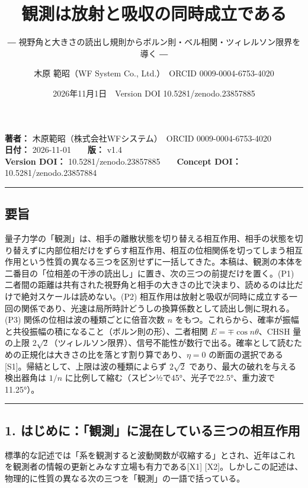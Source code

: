 \documentclass[
  a4paper,
]{ltjsarticle}
\title{観測は放射と吸収の同時成立である}
\subtitle{―
視野角と大きさの読出し規則からボルン則・ベル相関・ツィレルソン限界を導く
―}
\author{木原 範昭（WF System Co., Ltd.）　ORCID 0009-0004-6753-4020}
\date{2026年11月1日　Version DOI 10.5281/zenodo.23857885}
\begin{document}
\maketitle

\textbf{著者：} 木原範昭（株式会社WFシステム）　ORCID
0009-0004-6753-4020\\
\textbf{日付：} 2026-11-01　　\textbf{版：} v1.4\\
\textbf{Version DOI：} 10.5281/zenodo.23857885　　\textbf{Concept DOI：}
10.5281/zenodo.23857884

\begin{center}\rule{0.5\linewidth}{0.5pt}\end{center}

\subsection{要旨}\label{ux8981ux65e8}

量子力学の「観測」は、相手の離散状態を切り替える相互作用、相手の状態を切り替えずに内部位相だけをずらす相互作用、相互の位相関係を切ってしまう相互作用という性質の異なる三つを区別せずに一括してきた。本稿は、観測の本体を二番目の「位相差の干渉の読出し」に置き、次の三つの前提だけを置く。(P1)
二者間の距離は共有された視野角と相手の大きさの比で決まり、読めるのは比だけで絶対スケールは読めない。(P2)
相互作用は放射と吸収が同時に成立する一回の関係であり、光速は局所時計どうしの換算係数として読出し側に現れる。(P3)
関係の位相は波の種類ごとに倍音次数 \(n\)
をもつ。これらから、確率が振幅と共役振幅の積になること（ボルン則の形）、二者相関
\(E=\mp\cos n\theta\)、CHSH 量の上限
\(2\sqrt{2}\)（ツィレルソン限界）、信号不能性が数行で出る。確率として読むための正規化は大きさの比を落とす割り算であり、\(\eta=0\)
の断面の選択である{[}S1{]}。帰結として、上限は波の種類によらず
\(2\sqrt{2}\) であり、最大の破れを与える検出器角は \(1/n\)
に比例して縮む（スピン½で45°、光子で22.5°、重力波で11.25°）。

\begin{center}\rule{0.5\linewidth}{0.5pt}\end{center}

\subsection{1.
はじめに：「観測」に混在している三つの相互作用}\label{ux306fux3058ux3081ux306bux89b3ux6e2cux306bux6df7ux5728ux3057ux3066ux3044ux308bux4e09ux3064ux306eux76f8ux4e92ux4f5cux7528}

標準的な記述では「系を観測すると波動関数が収縮する」とされ、近年はこれを観測者の情報の更新とみなす立場も有力である{[}X1{]}
{[}X2{]}。しかしこの記述は、物理的に性質の異なる次の三つを「観測」の一語で括っている。
\end{document}
